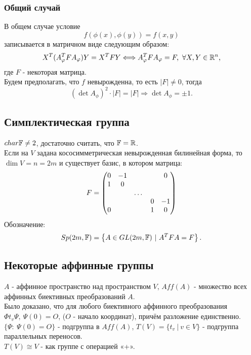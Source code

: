 \subsubsection*{Общий случай}
В общем случае условие
\[f(\phi(x), \phi(y)) = f(x,y)\]
записывается в матричном виде следующим образом:
\[X^T(A_{\varphi}^T F A_{\varphi}) Y = X^T F Y \Longleftrightarrow A_{\varphi}^T F A_{\varphi} = F, \ \forall X, Y \in \mathbb{R}^n,\]
где $F$ - некоторая матрица.\\
Будем предполагать, что $f$ невырожденна, то есть $|F| \neq 0$, тогда
\[(\det{A_{\phi}})^2 \cdot |F| = |F| \Longrightarrow \det{A_{\phi}} = \pm 1.\]
\subsection{Симплектическая группа}
$char \mathbb{F} \neq 2$, достаточно считать, что $\mathbb{F} = \mathbb{R}$.\\
Если на $V$ задана кососимметрическая невырожденная билинейная форма, то $\dim{V} = n = 2m$ и существует базис, в котором матрица: 
\[F = \begin{pmatrix}
    0 & -1 & \empty & \empty & 0\\
    1 & 0 & \empty & \empty & \empty\\
    \empty & \empty & \dots & \empty \empty\\
    \empty & \empty & \empty & 0 & -1\\
    0 & \empty & \empty & 1 & 0\\
\end{pmatrix}\]
Обозначение: 
\[Sp(2m, \mathbb{F}) = \left\{A \in GL(2m, \mathbb{F}) \ | \ A^T F A = F\right\}.\]
\subsection{Некоторые аффинные группы}
$A$ - аффинное пространство над пространством $V$, $Aff(A)$ - множество всех аффинных биективных преобразований $A$.\\
Было доказано, что для любого биективного аффинного преобразования $\Phi t_v \Psi, \ \Psi(0) = O$, ($O$ - начало координат), причём разложение единственно.\\
$\{\Psi: \ \Psi(0) = O\}$ - подгруппа в $Aff(A)$, $T(V) = \{t_v \ | \ v \in V\}$ - подгруппа параллельных переносов.\\
$T(V) \cong V$ - как группе с операцией «+».